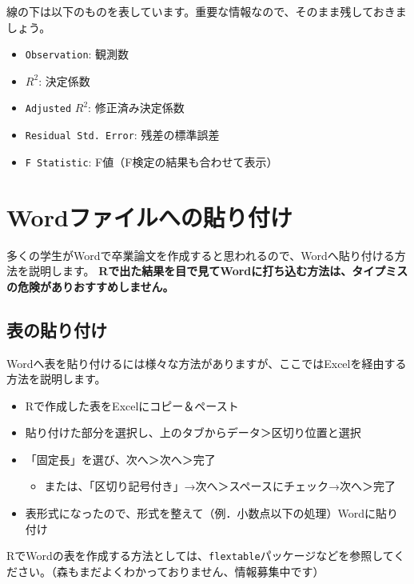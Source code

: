 \documentclass[
]{book}
\providecommand{\tightlist}{%
  \setlength{\itemsep}{0pt}\setlength{\parskip}{0pt}}
\begin{document}
線の下は以下のものを表しています。重要な情報なので、そのまま残しておきましょう。

\begin{itemize}
\tightlist
\item
  \texttt{Observation}: 観測数
\item
  \(R^2\): 決定係数
\item
  \texttt{Adjusted} \(R^2\): 修正済み決定係数
\item
  \texttt{Residual\ Std.\ Error}: 残差の標準誤差
\item
  \texttt{F\ Statistic}: F値（F検定の結果も合わせて表示）
\end{itemize}

\hypertarget{Word}{%
\chapter{Wordファイルへの貼り付け}\label{Word}}

多くの学生がWordで卒業論文を作成すると思われるので、Wordへ貼り付ける方法を説明します。
\textbf{Rで出た結果を目で見てWordに打ち込む方法は、タイプミスの危険がありおすすめしません。}

\hypertarget{ux8868ux306eux8cbcux308aux4ed8ux3051}{%
\section{表の貼り付け}\label{ux8868ux306eux8cbcux308aux4ed8ux3051}}

Wordへ表を貼り付けるには様々な方法がありますが、ここではExcelを経由する方法を説明します。

\begin{itemize}
\tightlist
\item
  Rで作成した表をExcelにコピー＆ペースト
\item
  貼り付けた部分を選択し、上のタブからデータ＞区切り位置と選択
\item
  「固定長」を選び、次へ＞次へ＞完了

  \begin{itemize}
  \tightlist
  \item
    または、「区切り記号付き」→次へ＞スペースにチェック→次へ＞完了
  \end{itemize}
\item
  表形式になったので、形式を整えて（例．小数点以下の処理）Wordに貼り付け
\end{itemize}

RでWordの表を作成する方法としては、\texttt{flextable}パッケージなどを参照してください。（森もまだよくわかっておりません、情報募集中です）

  
\end{document}
